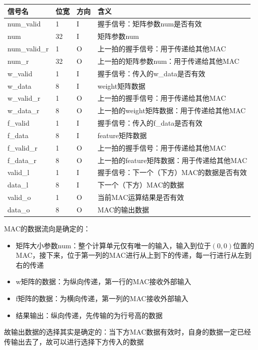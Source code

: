 \documentclass[12pt,a4paper]{article}
\begin{document}
\begin{longtable}[]{@{}l|l|l|l@{}}
\toprule\noalign{}
信号名 & 位宽 & 方向 & 含义 \\
\midrule\noalign{}
\endhead
\bottomrule\noalign{}
\endlastfoot
num\_valid & 1 & I & 握手信号：矩阵参数num是否有效 \\
num & 32 & I & 矩阵参数num \\
num\_valid\_r & 1 & O & 上一拍的握手信号：用于传递给其他MAC \\
num\_r & 32 & O & 上一拍的矩阵参数num：用于传递给其他MAC \\
w\_valid & 1 & I & 握手信号：传入的w\_data是否有效 \\
w\_data & 8 & I & weight矩阵数据 \\
w\_valid\_r & 1 & O & 上一拍的握手信号：用于传递给其他MAC \\
w\_data\_r & 8 & O & 上一拍的weight矩阵数据：用于传递给其他MAC \\
f\_valid & 1 & I & 握手信号：传入的f\_data是否有效 \\
f\_data & 8 & I & feature矩阵数据 \\
f\_valid\_r & 1 & O & 上一拍的握手信号：用于传递给其他MAC \\
f\_data\_r & 8 & O & 上一拍的feature矩阵数据：用于传递给其他MAC \\
valid\_l & 1 & I & 握手信号：下一个（下方）MAC的数据是否有效 \\
data\_l & 8 & I & 下一个（下方）MAC的数据 \\
valid\_o & 1 & O & 当前MAC运算结果是否有效 \\
data\_o & 8 & O & MAC的输出数据 \\
\end{longtable}

MAC的数据流向是确定的：

\begin{itemize}
\item
  矩阵大小参数num：整个计算单元仅有唯一的输入，输入到位于\((0, 0)\)位置的MAC，接下来，位于第一列的MAC进行从上到下的传递，每一行进行从左到右的传递
\item
  w矩阵的数据：为纵向传递，第一行的MAC接收外部输入
\item
  f矩阵的数据：为横向传递，第一列的MAC接收外部输入
\item
  结果输出：纵向传递，先传输的为行号高的数据
\end{itemize}

故输出数据的选择其实是确定的：当下方MAC数据有效时，自身的数据一定已经传输出去了，故可以进行选择下方传入的数据
\end{document}
